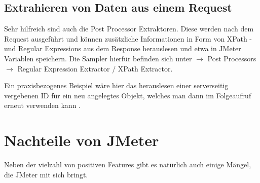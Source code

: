 \documentclass[a4paper,12pt]{article}
\begin{document}
\subsection{Extrahieren von Daten aus einem Request}
Sehr hilfreich sind auch die Post Processor Extraktoren. Diese werden nach dem Request ausgeführt und können zusätzliche Informationen in Form von XPath -und Regular Expressions aus dem Response herauslesen und etwa in JMeter Variablen speichern. Die Sampler hierfür befinden sich unter $\rightarrow$ Post Processors $\rightarrow$ Regular Expression Extractor / XPath Extractor.

Ein praxisbezogenes Beispiel wäre hier das herauslesen einer serverseitig vergebenen ID für ein neu angelegtes Objekt, welches man dann im Folgeaufruf erneut verwenden kann \cite{online:lasttestjmeter}.   

\section{Nachteile von JMeter}
Neben der vielzahl von positiven Features gibt es natürlich auch einige Mängel, die JMeter mit sich bringt.
\end{document}
